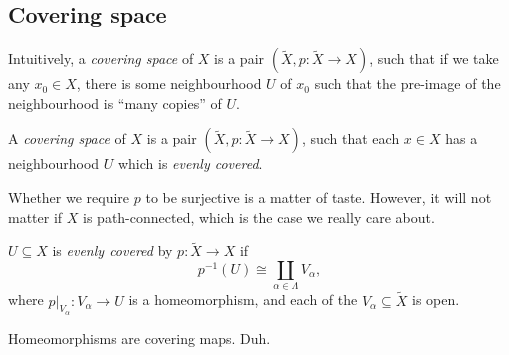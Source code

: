 \documentclass[a4paper]{article}
\begin{document}
\subsection{Covering space}
Intuitively, a \emph{covering space} of $X$ is a pair $(\tilde{X}, p: \tilde{X} \to X)$, such that if we take any $x_0 \in X$, there is some neighbourhood $U$ of $x_0$ such that the pre-image of the neighbourhood is ``many copies'' of $U$.
\begin{center}
\end{center}

\begin{defi}
  A \emph{covering space} of $X$ is a pair $(\tilde{X}, p: \tilde{X} \to X)$, such that each $x\in X$ has a neighbourhood $U$ which is \emph{evenly covered}.
\end{defi}
Whether we require $p$ to be surjective is a matter of taste. However, it will not matter if $X$ is path-connected, which is the case we really care about.

\begin{defi}
  $U \subseteq X$ is \emph{evenly covered} by $p: \tilde{X} \to X$ if
  \[
    p^{-1}(U) \cong \coprod_{\alpha \in \Lambda}V_\alpha,
  \]
  where $p|_{V_\alpha}: V_\alpha \to U$ is a homeomorphism, and each of the $V_\alpha \subseteq \tilde{X}$ is open.
\end{defi}

\begin{eg}
  Homeomorphisms are covering maps. Duh.
\end{eg}
\end{document}
